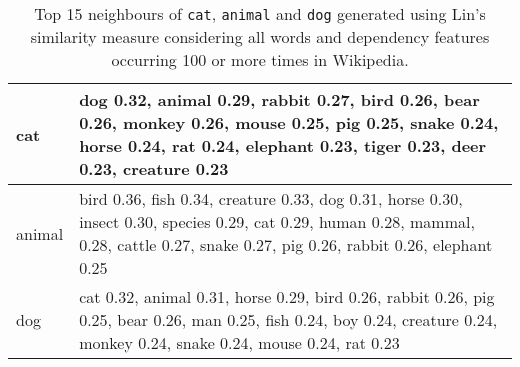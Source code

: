 \documentclass[11pt]{article}
\begin{document}
\begin{table}[ht]
\begin{tabular}{|l|p{14cm}|}
\hline
cat&dog 0.32, animal 0.29, rabbit 0.27, bird 0.26, bear 0.26, monkey 0.26, mouse 0.25, pig 0.25, snake 0.24, horse 0.24, rat 0.24, elephant 0.23, tiger 0.23, deer 0.23, creature 0.23\\
\hline
animal&bird 0.36, fish 0.34, creature 0.33, dog 0.31, horse 0.30, insect 0.30, species 0.29, cat 0.29, human 0.28, mammal, 0.28, cattle 0.27, snake 0.27, pig 0.26, rabbit 0.26, elephant 0.25\\
\hline
dog&cat 0.32, animal 0.31, horse 0.29, bird 0.26, rabbit 0.26, pig 0.25, bear 0.26, man 0.25, fish 0.24, boy 0.24, creature 0.24, monkey 0.24, snake 0.24, mouse 0.24, rat 0.23\\
\hline
\end{tabular}
\label{table:neighbours}
\caption{Top 15 neighbours of \texttt{cat}, \texttt{animal} and \texttt{dog} generated using Lin's similarity measure \cite{Lin1998} considering all words and dependency features occurring 100 or more times in Wikipedia.}
\end{table}
\end{document}
